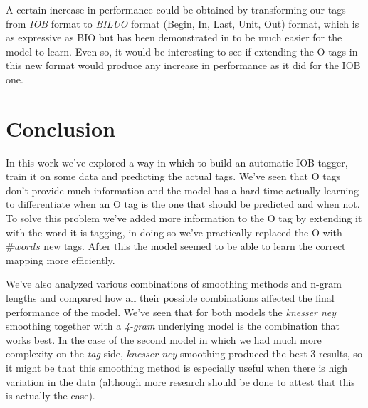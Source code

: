 \documentclass[11pt,a4paper]{article}
\begin{document}
	A certain increase in performance could be obtained by transforming our tags from \textit{IOB} format to \textit{BILUO} format (Begin, In, Last, Unit, Out) format, which is as expressive as BIO but has been demonstrated in \cite{DesignChallenges} to be much easier for the model to learn. Even so, it would be interesting to see if extending the O tags in this new format would produce any increase in performance as it did for the IOB one.
	

\section{Conclusion}
	
	In this work we've explored a way in which to build an automatic IOB tagger, train it on some data and predicting the actual tags. We've seen that O tags don't provide much information and the model has a hard time actually learning to differentiate when an O tag is the one that should be predicted and when not. To solve this problem we've added more information to the O tag by extending it with the word it is tagging, in doing so we've practically replaced the O with $\#words$ new tags. After this the model seemed to be able to learn the correct mapping more efficiently.
	
	We've also analyzed various combinations of smoothing methods and n-gram lengths and compared how all their possible combinations affected the final performance of the model. We've seen that for both models the \textit{knesser ney} smoothing together with a \textit{4-gram} underlying model is the combination that works best. In the case of the second model in which we had much more complexity on the \textit{tag} side, \textit{knesser ney} smoothing produced the best 3 results, so it might be that this smoothing method is especially useful when there is high variation in the data (although more research should be done to attest that this is actually the case).




%

%


%
\end{document}
